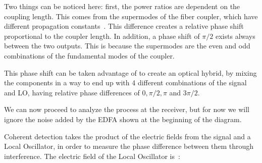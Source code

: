Two things can be noticed here: first, the power ratios are dependent on the coupling
 length. This comes from the supermodes of the fiber coupler, which have
 different propagation constants~\cite{agrawal04}. This difference creates a relative phase shift
 proportional to the coupler length. In addition, a phase shift of $\pi/2$
 exists always between the two outputs. This is because the supermodes are the
 even and odd combinations of the fundamental modes of the coupler.

 This phase shift can be taken advantage of to create an optical hybrid, by mixing
 the components in a way to end up with 4 different combinations of the signal
 and LO, having relative phase differences of $0, \pi/2, \pi$ and $3\pi/2$.

%



%
%

	We can now proceed to analyze the process at the receiver, but for now we will
	ignore the noise added by the EDFA shown at the beginning of the
	diagram.

	Coherent detection takes the product of the electric fields from the signal and
	a Local Oscillator, in order to measure the phase difference between them
	through interference. The electric field of the Local Oscillator
	is~\cite{kikuchi16}:

